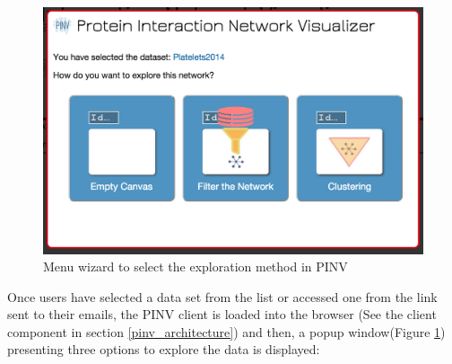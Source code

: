 \begin{figure}[ht]
\centering
\includegraphics[width=\textwidth]{figures/pinv_wizard.png}
\caption[Menu wizard to select the exploration method in PINV]{Menu wizard to select the exploration method in PINV
\label{fig:pinv_wizard}}
\end{figure}

Once users have selected a data set from the list or accessed one from the link sent to their emails, the PINV client is loaded into the browser (See the client component in section \ref{pinv_architecture}) and then, a popup window(Figure \ref{fig:pinv_wizard}) presenting three options to explore the data is displayed:

